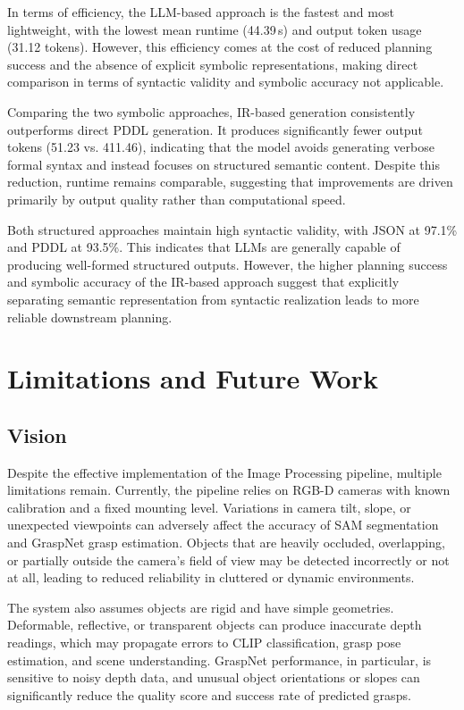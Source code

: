 \documentclass[12pt]{extarticle}
\begin{document}
In terms of efficiency, the LLM-based approach is the fastest and most lightweight, with the lowest mean runtime (44.39\,s) and output token usage (31.12 tokens). However, this efficiency comes at the cost of reduced planning success and the absence of explicit symbolic representations, making direct comparison in terms of syntactic validity and symbolic accuracy not applicable.

Comparing the two symbolic approaches, IR-based generation consistently outperforms direct PDDL generation. It produces significantly fewer output tokens (51.23 vs. 411.46), indicating that the model avoids generating verbose formal syntax and instead focuses on structured semantic content. Despite this reduction, runtime remains comparable, suggesting that improvements are driven primarily by output quality rather than computational speed.

Both structured approaches maintain high syntactic validity, with JSON at 97.1\% and PDDL at 93.5\%. This indicates that LLMs are generally capable of producing well-formed structured outputs. However, the higher planning success and symbolic accuracy of the IR-based approach suggest that explicitly separating semantic representation from syntactic realization leads to more reliable downstream planning.

\newpage
\section{Limitations and Future Work}

\subsection{Vision}

Despite the effective implementation of the Image Processing pipeline, multiple limitations remain.
Currently, the pipeline relies on RGB-D cameras with known calibration and a fixed mounting level. Variations in camera tilt, slope, or unexpected viewpoints can adversely affect the accuracy of SAM segmentation and GraspNet grasp estimation. Objects that are heavily occluded, overlapping, or partially outside the camera's field of view may be detected incorrectly or not at all, leading to reduced reliability in cluttered or dynamic environments. 

The system also assumes objects are rigid and have simple geometries. Deformable, reflective, or transparent objects can produce inaccurate depth readings, which may propagate errors to CLIP classification, grasp pose estimation, and scene understanding. GraspNet performance, in particular, is sensitive to noisy depth data, and unusual object orientations or slopes can significantly reduce the quality score and success rate of predicted grasps. 
\end{document}
